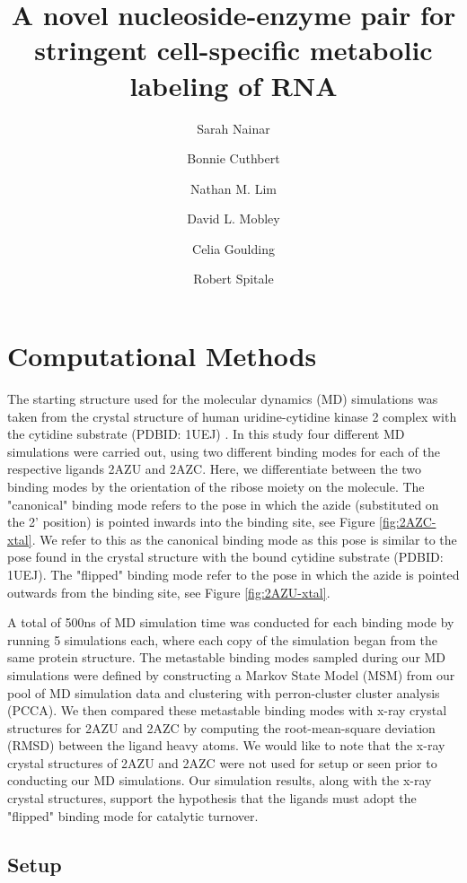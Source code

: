 \documentclass[fleqn,10pt]{wlscirep}
\title{A novel nucleoside-enzyme pair for stringent cell-specific metabolic labeling of RNA}
\author[1]{Sarah Nainar}
\author[1]{Bonnie Cuthbert}
\author[1]{Nathan M. Lim}
\author[1]{David L. Mobley}
\author[1]{Celia Goulding}
\author[1, *]{Robert Spitale}
\affil[1]{Department of Pharmaceutical Sciences, University of California---Irvine, Irvine, California 92697, United States}
\affil[*]{rspitale@uci.edu}
\begin{document}
\flushbottom
\maketitle
\tableofcontents

\section{Computational Methods}
The starting structure used for the molecular dynamics (MD) simulations was taken from the crystal structure of human uridine-cytidine kinase 2 complex with the cytidine substrate (PDBID: 1UEJ) \cite{suzuki2004structural}.
In this study four different MD simulations were carried out, using two different binding modes for each of the respective ligands 2AZU and 2AZC.
Here, we differentiate between the two binding modes by the orientation of the ribose moiety on the molecule. 
The "canonical" binding mode refers to the pose in which the azide (substituted on the 2' position) is pointed inwards into the binding site, see Figure \ref{fig:2AZC-xtal}.
We refer to this as the canonical binding mode as this pose is similar to the pose found in the crystal structure with the bound cytidine substrate (PDBID: 1UEJ).
The "flipped" binding mode refer to the pose in which the azide is pointed outwards from the binding site, see Figure \ref{fig:2AZU-xtal}.

A total of 500ns of MD simulation time was conducted for each binding mode by running 5 simulations each, where each copy of the simulation began from the same protein structure.
The metastable binding modes sampled during our MD simulations were defined by constructing a Markov State Model (MSM) from our pool of MD simulation data and clustering with perron-cluster cluster analysis (PCCA).
We then compared these metastable binding modes with x-ray crystal structures for 2AZU and 2AZC by computing the root-mean-square deviation (RMSD) between the ligand heavy atoms.
We would like to note that the x-ray crystal structures of 2AZU and 2AZC were not used for setup or seen prior to conducting our MD simulations.
Our simulation results, along with the x-ray crystal structures, support the hypothesis that the ligands must adopt the "flipped" binding mode for catalytic turnover.

\subsection{Setup}
\end{document}
